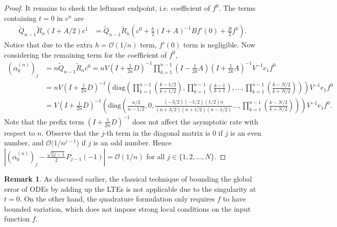\documentclass{article}
\theoremstyle{definition}
\newtheorem{remark}{Remark}[section]
\newcommand{\pr}[1]{ \left( #1 \right) }
\newcommand{\abs}[1]{\left| #1 \right|}
\begin{document}
\begin{proof}
It remains to check the leftmost endpoint, i.e. coefficient of $f^0$. The terms containing $t=0$ in $c^n$ are 
\begin{align*}
    \tilde{Q}_{n-1} \tilde{R}_{n} \pr{I+A/2} c^1 
    &= \tilde{Q}_{n-1} \tilde{R}_{n} 
    \pr{ c^0 + \frac{h}{2}\pr{I+A}^{-1}Bf'(0)
    + \frac{B}{2}f^1}.
\end{align*}
Notice that due to the extra $h = \mathcal{O}(1/n)$ term,
$f'(0)$ term is negligible. Now considering the remaining term for the coefficient of $f^0$,
\begin{align*}
    \pr{\alpha_0^{(n)}}_j &= 
    n \tilde{Q}_{n-1} \tilde{R}_{n} c^0 
    = nV \pr{I+\frac{1}{2n}D}^{-1}
         \prod_{k=1}^{n-1} 
         \pr{I - \frac{1}{2k}A}\pr{I + \frac{1}{2k}A}^{-1}
    V^{-1} e_1f^0 \\
    &= nV \pr{I+\frac{1}{2n}D}^{-1}
    \pr{ \text{diag}\pr{ \prod_{k=1}^{n-1}\pr{\frac{k-1/2}{k+1/2} }, \prod_{k=1}^{n-1}\pr{\frac{k-1}{k+1} }, \dots, \prod_{k=1}^{n-1} \pr{ \frac{k-N/2}{k+N/2} }}}V^{-1} e_1 f^0 \\
    &= V \pr{I+\frac{1}{2n}D}^{-1}
    \pr{ \text{diag}\pr{ \frac{n/2}{n-1/2}, 0, \frac{(-3/2)(-1/2)(1/2)n}{(n+3/2)(n+1/2)(n-1/2)} \dots,  \prod_{k=1}^{n-1} \pr{ \frac{k-N/2}{k+N/2} }}}V^{-1} e_1 f^0.
\end{align*}
Note that the prefix term $\pr{I + \frac{1}{2n}D}^{-1}$ does not affect the asymptotic rate with respect to $n$. 
Observe that the $j$-th term in the diagonal matrix is $0$ if $j$ is an even number, and $\mathcal{O}(1/n^{j-1}$) if $j$ is an odd number. Hence  $\abs{ \pr{\alpha_0^{(n)}}_j -  \frac{\sqrt{2j-1}}{2}P_{j-1}(-1)} = \mathcal{O}(1/n)$ for all $j \in \{1,2, \dots, N\}$. 
\end{proof}

\begin{remark}
As discussed earlier, the classical technique of bounding the global error of ODEs by adding up the LTEs is not applicable due to the singularity at $t=0$. On the other hand, the quadrature formulation only requires $f$ to have bounded variation, which does not impose strong local conditions on the input function $f$.
\end{remark}
\end{document}
